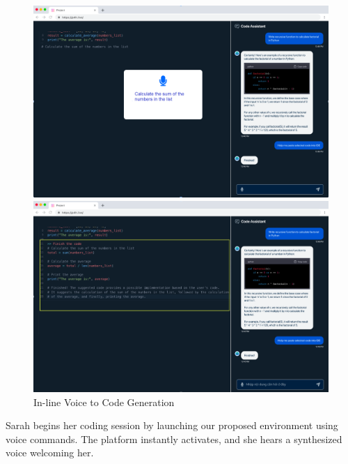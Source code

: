 \begin{figure}[t]
\centering
\begin{minipage}{.48\textwidth}
\centering
\includegraphics[width=.98\textwidth]{p4h-3}
\end{minipage}
\begin{minipage}{.48\textwidth}
\centering
\includegraphics[width=.98\textwidth]{p4h-4}
\end{minipage}  
\caption{In-line Voice to Code Generation}
\label{thrust3-two}
\end{figure}

 Sarah begins her coding
session by launching our proposed environment using voice
commands. The platform instantly activates, and she hears a
synthesized voice welcoming her.

